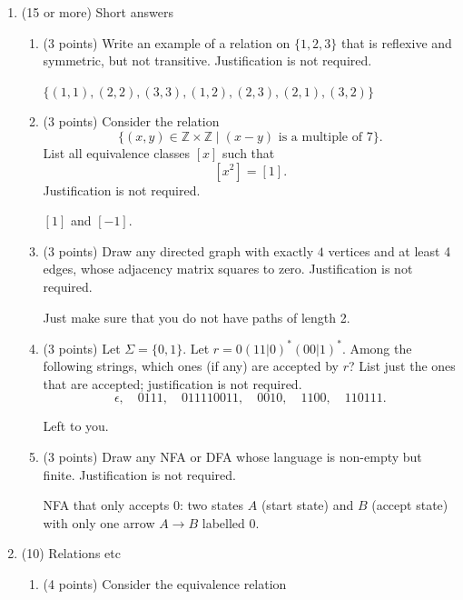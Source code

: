 \documentclass{amsart}
\begin{document}
\begin{enumerate}
\begin{enumerate}
\begin{solution}
True.
\end{solution}
\end{enumerate}
\item (15 or more) Short answers
\label{sec:orge857711}
\begin{enumerate}
\item (3 points) Write an example of a relation on \(\{1,2,3\}\) that is reflexive and symmetric, but not transitive. Justification is not required.
\begin{solution}
\(\{(1,1), (2,2), (3,3), (1,2), (2,3), (2,1), (3,2)\}\)
\end{solution}
\item (3 points) Consider the relation
\[\{(x,y) \in \mathbb{Z} \times \mathbb{Z} \mid (x-y)\text{ is a multiple of 7}\}.\]
List all equivalence classes \([x]\) such that
\[[x^2] = [1].\]
Justification is not required.
\begin{solution}
\([1]\) and \([-1]\).
\end{solution}
\item (3 points) Draw any directed graph with exactly \(4\) vertices and at least 4 edges, whose adjacency matrix squares to zero. Justification is not required.
\begin{solution}
Just make sure that you do not have paths of length 2.
\end{solution}
\item (3 points) Let \(\Sigma = \{0,1\}\). Let \(r = 0(11|0)^{\ast}(00|1)^{\ast}\).
Among the following strings, which ones (if any) are accepted by \(r\)? List just the ones that are accepted; justification is not required.
\[\epsilon, \quad 0111,\quad 011110011, \quad 0010,\quad 1100,\quad 110111.\]
\begin{solution}
Left to you.
\end{solution}
\item (3 points) Draw any NFA or DFA whose language is non-empty but finite. Justification is not required.
\begin{solution}
NFA that only accepts \(0\): two states \(A\) (start state) and \(B\) (accept state) with only one arrow \(A \to B\) labelled \(0\).
\end{solution}
\end{enumerate}
\item (10) Relations etc
\label{sec:org6f750c8}
\begin{enumerate}
\item (4 points) Consider the equivalence relation

\end{enumerate}
\end{enumerate}
\end{document}
